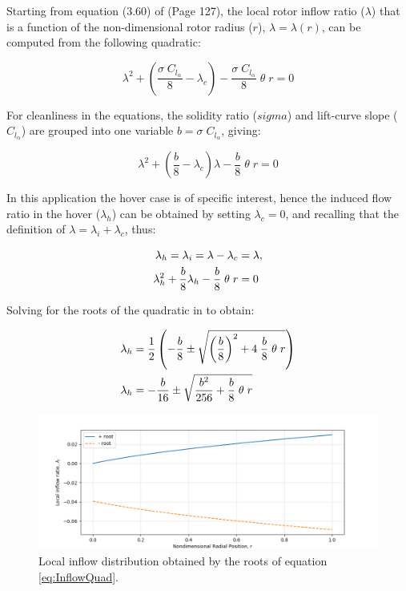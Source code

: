 \documentclass[11pt,a4paper]{article}
\begin{document}
Starting from equation (3.60) of \cite{Leishman} (Page 127), the local rotor inflow ratio ($\lambda$) that is a function of the non-dimensional rotor radius ($r$), $\lambda = \lambda(r)$, can be computed from the following quadratic:

\begin{equation}
	\label{eq:InflowQuad}
	\lambda^{2} + \left(\dfrac{\sigma \; C_{l_{\alpha}}}{8} - \lambda_{c} \right) - \dfrac{\sigma \; C_{l_{\alpha}}}{8} \; \theta \; r = 0
\end{equation}

For cleanliness in the equations, the solidity ratio ($sigma$) and lift-curve slope ($C_{l_{\alpha}}$) are grouped into one variable $b = \sigma \; C_{l_{\alpha}}$, giving:

\newpage
\thispagestyle{otherpagestyle}

\begin{equation}
	\lambda^{2} + \left(\dfrac{b}{8} - \lambda_{c} \right)\lambda - \dfrac{b}{8} \; \theta \; r = 0
\end{equation}

In this application the hover case is of specific interest, hence the induced flow ratio in the hover ($\lambda_{h}$) can be obtained by setting $\lambda_{c} = 0$, and recalling that the definition of $\lambda = \lambda_{i} + \lambda_{c}$, thus:

\begin{alignat}{2}
	\lambda_{h} = \lambda_{i} = \lambda - \lambda_{c} &= \lambda, \notag \\
    \lambda_{h}^{2} + \dfrac{b}{8}\lambda_{h} - \dfrac{b}{8} \; \theta \; r & = 0 \label{eq:HoverInflow}
\end{alignat}

Solving for the roots of the quadratic in  to obtain:

\begin{alignat}{2}
	\lambda_{h} &= \dfrac{1}{2} \left( - \dfrac{b}{8} \pm \sqrt{\left(\dfrac{b}{8}\right)^{2} + 4 \; \dfrac{b}{8} \; \theta \; r } \right) \notag \\
	\lambda_{h} &= - \dfrac{b}{16} \pm \sqrt{\dfrac{b^{2}}{256} + \dfrac{b}{8} \; \theta \; r }
\end{alignat}



\begin{figure}[h!]
	\centering
	\includegraphics[width=\textwidth]{inflow_distribution.png}
	\caption{Local inflow distribution obtained by the roots of equation \ref{eq:InflowQuad}.\label{fig:InflowDist}}
\end{figure}





\renewcommand{\bibname}{References}


\end{document}
